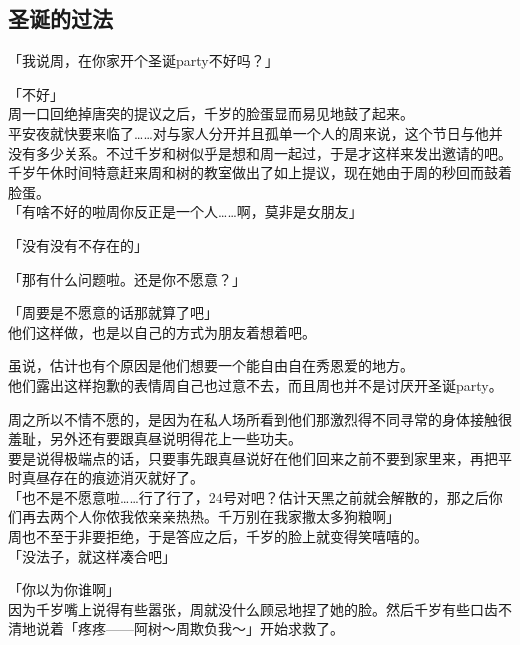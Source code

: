 \subsection{圣诞的过法}

「我说周，在你家开个圣诞party不好吗？」

「不好」\\

周一口回绝掉唐突的提议之后，千岁的脸蛋显而易见地鼓了起来。\\

平安夜就快要来临了……对与家人分开并且孤单一个人的周来说，这个节日与他并没有多少关系。不过千岁和树似乎是想和周一起过，于是才这样来发出邀请的吧。\\

千岁午休时间特意赶来周和树的教室做出了如上提议，现在她由于周的秒回而鼓着脸蛋。\\

「有啥不好的啦周你反正是一个人……啊，莫非是女朋友」

「没有没有不存在的」

「那有什么问题啦。还是你不愿意？」

「周要是不愿意的话那就算了吧」\\

他们这样做，也是以自己的方式为朋友着想着吧。

虽说，估计也有个原因是他们想要一个能自由自在秀恩爱的地方。\\

他们露出这样抱歉的表情周自己也过意不去，而且周也并不是讨厌开圣诞party。

周之所以不情不愿的，是因为在私人场所看到他们那激烈得不同寻常的身体接触很羞耻，另外还有要跟真昼说明得花上一些功夫。\\

要是说得极端点的话，只要事先跟真昼说好在他们回来之前不要到家里来，再把平时真昼存在的痕迹消灭就好了。\\

「也不是不愿意啦……行了行了，24号对吧？估计天黑之前就会解散的，那之后你们再去两个人你侬我侬亲亲热热。千万别在我家撒太多狗粮啊」\\

周也不至于非要拒绝，于是答应之后，千岁的脸上就变得笑嘻嘻的。\\

「没法子，就这样凑合吧」

「你以为你谁啊」\\

因为千岁嘴上说得有些嚣张，周就没什么顾忌地捏了她的脸。然后千岁有些口齿不清地说着「疼疼——阿树～周欺负我～」开始求救了。\\


